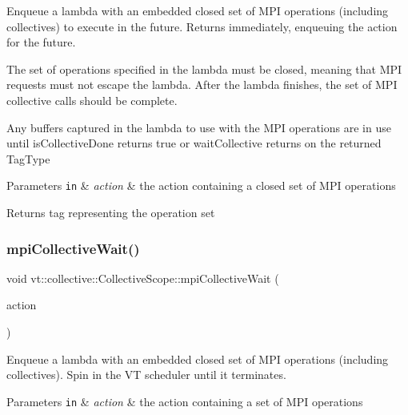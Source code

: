 Enqueue a lambda with an embedded closed set of M\+PI operations (including collectives) to execute in the future. Returns immediately, enqueuing the action for the future. 

The set of operations specified in the lambda must be closed, meaning that M\+PI requests must not escape the lambda. After the lambda finishes, the set of M\+PI collective calls should be complete.

Any buffers captured in the lambda to use with the M\+PI operations are in use until {\ttfamily is\+Collective\+Done} returns {\ttfamily true} or {\ttfamily wait\+Collective} returns on the returned {\ttfamily Tag\+Type} 


\begin{DoxyParams}[1]{Parameters}
\mbox{\tt in}  & {\em action} & the action containing a closed set of M\+PI operations\\
\hline
\end{DoxyParams}
\begin{DoxyReturn}{Returns}
tag representing the operation set 
\end{DoxyReturn}
\mbox{\label{structvt_1_1collective_1_1_collective_scope_a0ef41233afe63fc9ead8431e226af193}} 
\subsubsection{\texorpdfstring{mpi\+Collective\+Wait()}{mpiCollectiveWait()}}
{\footnotesize\ttfamily void vt\+::collective\+::\+Collective\+Scope\+::mpi\+Collective\+Wait (\begin{DoxyParamCaption}\item[{\hyperlink{namespacevt_ae0a5a7b18cc99d7b732cb4d44f46b0f3}{Action\+Type}}]{action }\end{DoxyParamCaption})}



Enqueue a lambda with an embedded closed set of M\+PI operations (including collectives). Spin in the VT scheduler until it terminates. 


\begin{DoxyParams}[1]{Parameters}
\mbox{\tt in}  & {\em action} & the action containing a set of M\+PI operations \\
\hline
\end{DoxyParams}
\mbox{\label{structvt_1_1collective_1_1_collective_scope_a4a756e93437119e20a72dfe0d9ede190}} 
